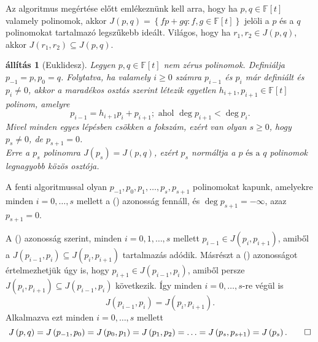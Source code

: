\documentclass[9pt, a4paper, showtrims]{memoir}
\makeatletter
\renewenvironment{proof}[1][\proofname]
    {\par\pushQED{\qed}%
    \normalfont \topsep6\p@\@plus6\p@\relax
    \trivlist
    \item[\hskip\labelsep
        \itshape
    #1\@addpunct{:}]\ignorespaces}
    {\popQED\endtrivlist\@endpefalse}
\theoremstyle{plain}
\newtheorem{proposition}{állítás}[chapter]
\theoremstyle{remark}
\theoremstyle{definition}
\makeatother
\begin{document}
Az algoritmus megértése előtt emlékeznünk kell arra,
hogy ha $p,q\in\mathbb{F}\left[ t \right]$ valamely polinomok, akkor
\(
J\left( p,q \right)=\left\{ fp+gq:f,g\in\mathbb{F}\left[ t \right] \right\}
\)
jelöli a $p$ és a $q$ polinomokat tartalmazó legszűkebb ideált.
Világos, hogy ha $r_1,r_2\in J\left( p,q \right)$, akkor
$J\left( r_1,r_2 \right)\subseteq J\left( p,q \right)$.
\begin{proposition}[Euklidesz]
	Legyen $p,q\in\mathbb{F}\left[ t \right]$ nem zérus polinomok.
	Definiálja $p_{-1}=p,p_{0}=q$.
	Folytatva, ha valamely $i\geq 0$ számra $p_{i-1}$ és $p_i$ már definiált és $p_i\neq 0$,
	akkor a maradékos osztás szerint létezik egyetlen $h_{i+1},p_{i+1}\in\mathbb{F}\left[ t \right]$ polinom,
	amelyre
	\[
		p_{i-1}=h_{i+1}p_i+p_{i+1};
		\text{ ahol }
		\deg p_{i+1}<\deg p_i.\tag{\dag}
	\]
	Mivel minden egyes lépésben csökken a fokszám,
	ezért van olyan $s\geq 0$,
	hogy $p_s\neq 0$, de $p_{s+1}=0$.
	\\
	Erre a $p_s$ polinomra $J\left( p_s \right)=J\left( p,q \right)$, ezért
	$p_s$ normáltja a $p\text{ és a }q$ polinomok legnagyobb közös osztója.
\end{proposition}
\begin{proof}
	A fenti algoritmussal olyan
	$p_{-1}, p_0,p_1,\ldots,p_s,p_{s+1}$ polinomokat kapunk,
	amelyekre minden $i=0,\ldots,s$ mellett a (\dag) azonosság fennáll,
	és $\deg p_{s+1}=-\infty$,
	azaz $p_{s+1}=0$.

	A (\dag) azonosság szerint,
	minden $i=0,1,\ldots,s$ mellett
	\begin{math}
		p_{i-1}\in J\left( p_i,p_{i+1} \right)
	\end{math},
	amiből a
	\begin{math}
		J\left( p_{i-1},p_i \right)\subseteq J\left( p_i,p_{i+1} \right)
	\end{math}
	tartalmazás adódik.
	Másrészt a (\dag) azonosságot értelmezhetjük úgy is, hogy
	\(
	p_{i+1}\in J\left( p_{i-1},p_i \right)
	\),
	amiből persze
	\begin{math}
		J\left( p_i,p_{i+1} \right)\subseteq J\left( p_{i-1},p_i \right)
	\end{math}
	következik.
	Így minden $i=0,\ldots,s$-re végül is
	\[
		J\left( p_{i-1},p_i \right)
		=
		J\left( p_i,p_{i+1} \right).
	\]
	Alkalmazva ezt minden $i=0,\ldots,s$ mellett
	\[
		J\left( p,q \right)
		=
		J\left( p_{-1},p_0 \right)
		=
		J\left( p_0,p_1 \right)
		=
		J\left( p_1,p_2 \right)
		=\ldots=
		J\left( p_s,p_{s+1} \right)
		=J\left( p_s \right).\qedhere
	\]
\end{proof}
\end{document}
